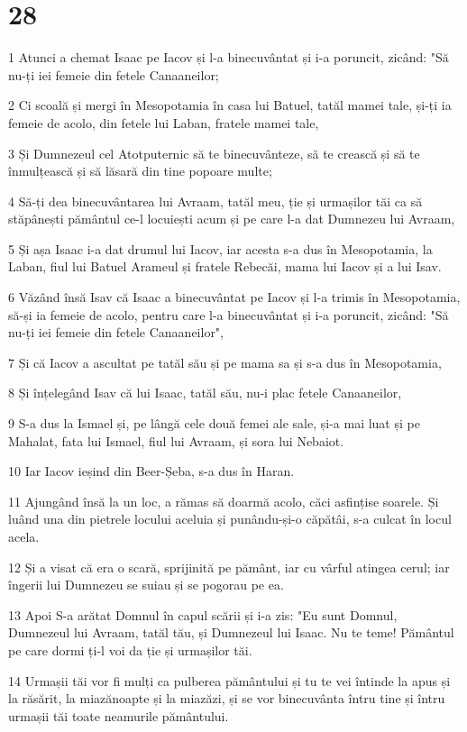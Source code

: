 \chapter{28}

\par 1 Atunci a chemat Isaac pe Iacov și l-a binecuvântat și i-a poruncit, zicând: "Să nu-ți iei femeie din fetele Canaaneilor;
\par 2 Ci scoală și mergi în Mesopotamia în casa lui Batuel, tatăl mamei tale, și-ți ia femeie de acolo, din fetele lui Laban, fratele mamei tale,
\par 3 Și Dumnezeul cel Atotputernic să te binecuvânteze, să te crească și să te înmulțească și să lăsară din tine popoare multe;
\par 4 Să-ți dea binecuvântarea lui Avraam, tatăl meu, ție și urmașilor tăi ca să stăpânești pământul ce-l locuiești acum și pe care l-a dat Dumnezeu lui Avraam,
\par 5 Și așa Isaac i-a dat drumul lui Iacov, iar acesta s-a dus în Mesopotamia, la Laban, fiul lui Batuel Arameul și fratele Rebecăi, mama lui Iacov și a lui Isav.
\par 6 Văzând însă Isav că Isaac a binecuvântat pe Iacov și l-a trimis în Mesopotamia, să-și ia femeie de acolo, pentru care l-a binecuvântat și i-a poruncit, zicând: "Să nu-ți iei femeie din fetele Canaaneilor",
\par 7 Și că Iacov a ascultat pe tatăl său și pe mama sa și s-a dus în Mesopotamia,
\par 8 Și înțelegând Isav că lui Isaac, tatăl său, nu-i plac fetele Canaaneilor,
\par 9 S-a dus la Ismael și, pe lângă cele două femei ale sale, și-a mai luat și pe Mahalat, fata lui Ismael, fiul lui Avraam, și sora lui Nebaiot.
\par 10 Iar Iacov ieșind din Beer-Șeba, s-a dus în Haran.
\par 11 Ajungând însă la un loc, a rămas să doarmă acolo, căci asfințise soarele. Și luând una din pietrele locului aceluia și punându-și-o căpătâi, s-a culcat în locul acela.
\par 12 Și a visat că era o scară, sprijinită pe pământ, iar cu vârful atingea cerul; iar îngerii lui Dumnezeu se suiau și se pogorau pe ea.
\par 13 Apoi S-a arătat Domnul în capul scării și i-a zis: "Eu sunt Domnul, Dumnezeul lui Avraam, tatăl tău, și Dumnezeul lui Isaac. Nu te teme! Pământul pe care dormi ți-l voi da ție și urmașilor tăi.
\par 14 Urmașii tăi vor fi mulți ca pulberea pământului și tu te vei întinde la apus și la răsărit, la miazănoapte și la miazăzi, și se vor binecuvânta întru tine și întru urmașii tăi toate neamurile pământului.
